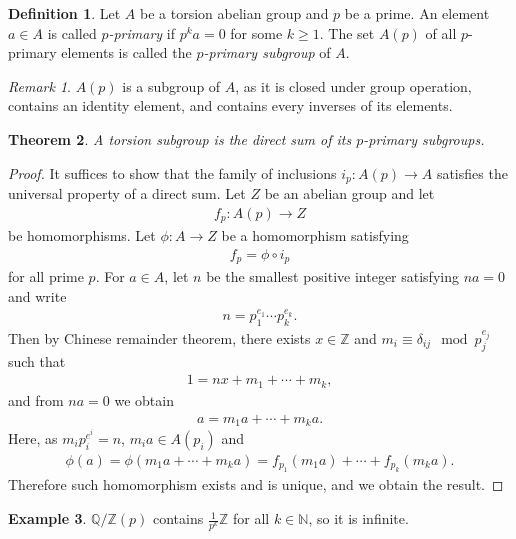 \documentclass[12pt]{report}
\theoremstyle{plain}
\newtheorem{theorem}{Theorem}[section]
\theoremstyle{remark}
\newtheorem*{remark}{Remark}
\theoremstyle{definition}
\newtheorem{definition}[theorem]{Definition}
\newtheorem{example}[theorem]{Example}
\newcommand{\N}{\mathbb{N}}
\newcommand{\Z}{\mathbb{Z}}
\newcommand{\Q}{\mathbb{Q}}
\begin{document}
\begin{definition}
    Let $A$ be a torsion abelian group and $p$ be a prime. An element $a\in A$ is called \emph{$p$-primary} if $p^k a = 0$ for some $k\ge 1$. The set $A(p)$ of all $p$-primary elements is called the \emph{$p$-primary subgroup} of $A$.
\end{definition}
\begin{remark}
    $A(p)$ is a subgroup of $A$, as it is closed under group operation, contains an identity element, and contains every inverses of its elements.
\end{remark}

\begin{theorem}
    A torsion subgroup is the direct sum of its $p$-primary subgroups.
\end{theorem}
\begin{proof}
    It suffices to show that the family of inclusions $i_p:A(p)\rightarrow A$ satisfies the universal property of a direct sum. Let $Z$ be an abelian group and let
    \begin{align*}
        f_p : A(p)\rightarrow Z
    \end{align*}
    be homomorphisms. Let $\phi:A\rightarrow Z$ be a homomorphism satisfying
    \begin{align*}
        f_p = \phi\circ i_p
    \end{align*}
    for all prime $p$. For $a\in A$, let $n$ be the smallest positive integer satisfying $na=0$ and write
    \begin{align*}
        n=p_1^{e_1}\cdots p_k^{e_k}.
    \end{align*}
    Then by Chinese remainder theorem, there exists $x\in \Z$ and $m_i\equiv \delta_{ij} \mod p_j^{e_j}$ such that
    \begin{align*}
        1 = nx + m_1+\cdots+m_k,
    \end{align*}
    and from $na=0$ we obtain
    \begin{align*}
        a = m_1 a + \cdots + m_k a.
    \end{align*}
    Here, as $m_i p_i^{e^i} = n$, $m_i a \in A(p_i)$ and
    \begin{align*}
        \phi(a) = \phi(m_1a+\cdots+m_k a) = f_{p_1}(m_1 a)+\cdots+f_{p_k}(m_k a).
    \end{align*}
    Therefore such homomorphism exists and is unique, and we obtain the result.
\end{proof}

\begin{example}
    $\Q/\Z(p)$ contains $\frac{1}{p^k}\Z$ for all $k\in \N$, so it is infinite.
\end{example}
\end{document}
